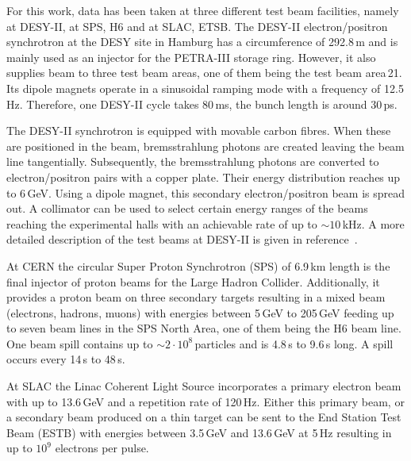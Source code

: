 
For this work, data has been taken at three different test beam facilities, namely at {DESY-II}, at SPS, H6 and at SLAC, ETSB.
The DESY-II electron/positron synchrotron at the DESY site in Hamburg has a circumference of 292.8\,m and is mainly used as an injector for the PETRA-III storage ring. 
However, it also supplies beam to three test beam areas, one  of them being the test beam area\,21.
Its dipole magnets operate in a sinusoidal ramping mode with a frequency of 12.5\,Hz. 
Therefore, one DESY-II cycle takes 80\,ms, the bunch length is around 30\,ps. 

The DESY-II synchrotron is equipped with movable carbon fibres. 
When these are positioned in the beam, bremsstrahlung photons are created leaving the beam line tangentially.
Subsequently, the bremsstrahlung photons are converted to electron/positron pairs with a copper plate. 
Their energy distribution reaches up to 6\,GeV. 
Using a dipole magnet, this secondary electron/positron beam is spread out.
A collimator can be used to select certain energy ranges of the beams reaching the experimental halls with an achievable rate of up to $\sim 10$\,kHz. 
A more detailed description of the test beams at {DESY-II} is given in reference~\cite{EUDET-2007-11}.

At CERN the circular Super Proton Synchrotron (SPS) of 6.9\,km length is the final injector of proton beams for the Large Hadron Collider. 
Additionally, it provides a proton beam on three secondary targets resulting in a mixed beam (electrons, hadrons, muons) with energies between 5\,GeV to 205\,GeV
 feeding up to seven beam lines in the SPS North Area, one of them being the H6 beam line. 
One beam spill contains up to $\sim 2\cdot10^8$\,particles and is 4.8\,s to 9.6\,s long. 
A spill occurs every 14\,s to 48\,s.\,\cite{SPS} 

At SLAC the Linac Coherent Light Source incorporates a primary electron beam with up to 13.6\,GeV and a repetition rate of 120\,Hz.
Either this primary beam, or a secondary beam produced on a thin target can be sent to the End Station Test Beam (ESTB) with energies between 3.5\,GeV and 13.6\,GeV at 5\,Hz
 resulting in up to $10^{9}$ electrons per pulse.\,\cite{SLAC}


